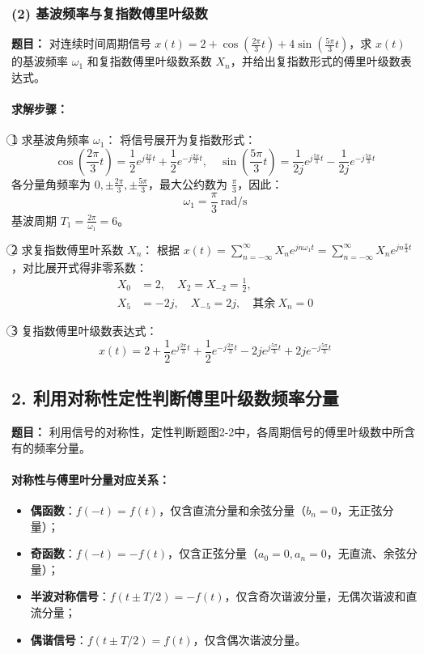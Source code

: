 \subsubsection{(2) 基波频率与复指数傅里叶级数}
\textbf{题目：} 对连续时间周期信号 \( x(t) = 2 + \cos\left(\frac{2\pi}{3}t\right) + 4\sin\left(\frac{5\pi}{3}t\right) \)，求 \( x(t) \) 的基波频率 \( \omega_1 \) 和复指数傅里叶级数系数 \( X_n \)，并给出复指数形式的傅里叶级数表达式。

\paragraph{求解步骤：}
\textcircled{1} 求基波角频率 \( \omega_1 \)：
将信号展开为复指数形式：
\[
\cos\left(\frac{2\pi}{3}t\right) = \frac{1}{2}e^{j\frac{2\pi}{3}t} + \frac{1}{2}e^{-j\frac{2\pi}{3}t}, \quad \sin\left(\frac{5\pi}{3}t\right) = \frac{1}{2j}e^{j\frac{5\pi}{3}t} - \frac{1}{2j}e^{-j\frac{5\pi}{3}t}
\]
各分量角频率为 \( 0, \pm\frac{2\pi}{3}, \pm\frac{5\pi}{3} \)，最大公约数为 \( \frac{\pi}{3} \)，因此：
\[
\boxed{\omega_1 = \frac{\pi}{3} \ \mathrm{rad/s}}
\]
基波周期 \( T_1 = \frac{2\pi}{\omega_1} = 6 \)。

\textcircled{2} 求复指数傅里叶系数 \( X_n \)：
根据 \( x(t) = \sum_{n=-\infty}^{\infty} X_n e^{jn\omega_1 t} = \sum_{n=-\infty}^{\infty} X_n e^{jn\frac{\pi}{3}t} \)，对比展开式得非零系数：
\[
\boxed{
\begin{aligned}
X_0 &= 2, \quad X_2 = X_{-2} = \frac{1}{2}, \\
X_5 &= -2j, \quad X_{-5} = 2j, \quad \text{其余} \ X_n=0
\end{aligned}
}
\]

\textcircled{3} 复指数傅里叶级数表达式：
\[
\boxed{x(t) = 2 + \frac{1}{2}e^{j\frac{2\pi}{3}t} + \frac{1}{2}e^{-j\frac{2\pi}{3}t} - 2j e^{j\frac{5\pi}{3}t} + 2j e^{-j\frac{5\pi}{3}t}}
\]

\subsection{2. 利用对称性定性判断傅里叶级数频率分量}
\textbf{题目：} 利用信号的对称性，定性判断题图2-2中，各周期信号的傅里叶级数中所含有的频率分量。

\paragraph{对称性与傅里叶分量对应关系：}
\begin{itemize}
    \item \textbf{偶函数}：\( f(-t)=f(t) \)，仅含直流分量和余弦分量（$b_n=0$，无正弦分量）；
    \item \textbf{奇函数}：\( f(-t)=-f(t) \)，仅含正弦分量（$a_0=0,a_n=0$，无直流、余弦分量）；
    \item \textbf{半波对称信号}：\( f(t\pm T/2)=-f(t) \)，仅含奇次谐波分量，无偶次谐波和直流分量；
    \item \textbf{偶谐信号}：\( f(t\pm T/2)=f(t) \)，仅含偶次谐波分量。
\end{itemize}

